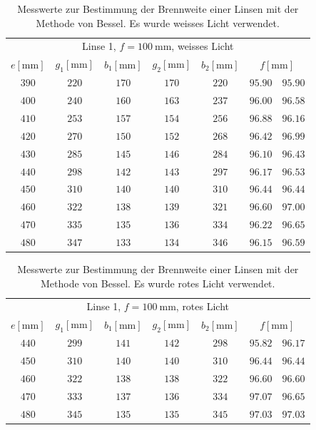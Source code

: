 \documentclass[
  parskip=half,
  bibliography=totoc,     %
  captions=tableheading,  %
  titlepage=firstiscover, %
]{scrartcl}
\begin{document}
\begin{table}[htp]
	\begin{center}
	\caption{Messwerte zur Bestimmung der Brennweite einer Linsen mit der Methode von Bessel. Es wurde weisses Licht verwendet.}
	\label{tab:weiss}
		\begin{tabular}{ccccccc}
			\toprule
			\multicolumn{7}{c}{Linse 1, $f=\SI{100}{\milli\metre}$, weisses Licht}\\
			{$e[\si{\milli\metre}]$} & {$g_1[\si{\milli\metre}]$} & {$b_1[\si{\milli\metre}]$} & {$g_2[\si{\milli\metre}]$} & {$b_2[\si{\milli\metre}]$} & \multicolumn{2}{c}{$f[\si{\milli\metre}]$}\\
			\midrule
			$390$ & $220$ & $170$ & $170$ & $220$ & $95.90$ & $95.90$\\
			$400$ & $240$ & $160$ & $163$ & $237$ & $96.00$ & $96.58$\\
			$410$ & $253$ & $157$ & $154$ & $256$ & $96.88$ & $96.16$\\
			$420$ & $270$ & $150$ & $152$ & $268$ & $96.42$ & $96.99$\\
			$430$ & $285$ & $145$ & $146$ & $284$ & $96.10$ & $96.43$\\
			$440$ & $298$ & $142$ & $143$ & $297$ & $96.17$ & $96.53$\\
			$450$ & $310$ & $140$ & $140$ & $310$ & $96.44$ & $96.44$\\
			$460$ & $322$ & $138$ & $139$ & $321$ & $96.60$ & $97.00$\\
			$470$ & $335$ & $135$ & $136$ & $334$ & $96.22$ & $96.65$\\
			$480$ & $347$ & $133$ & $134$ & $346$ & $96.15$ & $96.59$\\
			\bottomrule
		\end{tabular}
	\end{center}
\end{table}

\begin{table}[htp]
	\begin{center}
	\caption{Messwerte zur Bestimmung der Brennweite einer Linsen mit der Methode von Bessel. Es wurde rotes Licht verwendet.}
	\label{tab:rot}
		\begin{tabular}{ccccccc}
			\toprule
			\multicolumn{7}{c}{Linse 1, $f=\SI{100}{\milli\metre}$, rotes Licht}\\
			{$e[\si{\milli\metre}]$} & {$g_1[\si{\milli\metre}]$} & {$b_1[\si{\milli\metre}]$} & {$g_2[\si{\milli\metre}]$} & {$b_2[\si{\milli\metre}]$} & \multicolumn{2}{c}{$f[\si{\milli\metre}]$}\\
			\midrule
      $440$ & $299$ & $141$ & $142$ & $298$ & $95.82$ & $96.17$\\
      $450$ & $310$ & $140$ & $140$ & $310$ & $96.44$ & $96.44$\\
      $460$ & $322$ & $138$ & $138$ & $322$ & $96.60$ & $96.60$\\
      $470$ & $333$ & $137$ & $136$ & $334$ & $97.07$ & $96.65$\\
      $480$ & $345$ & $135$ & $135$ & $345$ & $97.03$ & $97.03$\\
      \bottomrule
		\end{tabular}
	\end{center}
\end{table}
\end{document}
